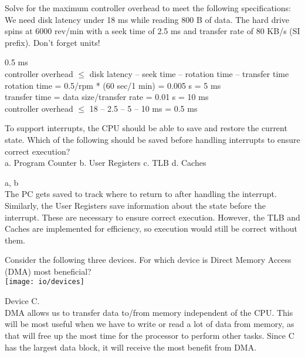 \begin{blocksection}
\question 
Solve for the maximum controller overhead to meet the following specifications: We need disk latency under 18 ms while reading 800 B of data.  The hard drive spins at 6000 rev/min with a seek time of 2.5 ms and transfer rate of 80 KB/s (SI prefix).  Don’t forget units!
\begin{solution}[0.5in] 
0.5 ms \\
controller overhead $\leq$ disk latency – seek time – rotation time – transfer time \\
rotation time = 0.5/rpm * (60 sec/1 min) = 0.005 s = 5 ms \\
transfer time = data size/transfer rate = 0.01 s = 10 ms \\
controller overhead $\leq$ 18 – 2.5 – 5 – 10 ms = 0.5 ms\\
\end{solution}

\question
To support interrupts, the CPU should be able to save and restore the current state. Which of the following should be saved before handling interrupts to ensure correct execution? \\
a. Program Counter 	b. User Registers 	c. TLB 		d. Caches
\begin{solution}[0.5in] 
a, b \\
The PC gets saved to track where to return to after handling the interrupt. Similarly, the User Registers save information about the state before the interrupt. These are necessary to ensure correct execution. However, the TLB and Caches are implemented for efficiency, so execution would still be correct without them.
\end{solution}

\question
Consider the following three devices. For which device is Direct Memory Access (DMA) most beneficial?\\

\texttt{[image: io/devices]}
\begin{solution}[0.5in] 
Device C. \\
DMA allows us to transfer data to/from memory independent of the CPU. This will be most useful when we have to write or read a lot of data from memory, as that will free up the most time for the processor to perform other tasks. Since C has the largest data block, it will receive the most benefit from DMA.     
\end{solution}

\end{blocksection}